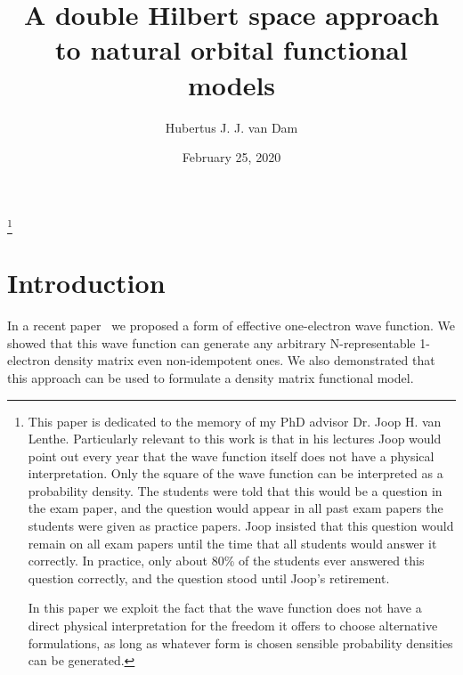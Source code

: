 \documentclass[pra,nofootinbib]{revtex4-1}
\begin{document}
\title{A double Hilbert space approach to natural orbital functional models}

\author{Hubertus J. J. van Dam}
\date{February 25, 2020}

\begin{abstract}
\end{abstract}

\maketitle
\tableofcontents

\footnote{This paper is dedicated to the memory of my PhD advisor Dr. Joop H. van Lenthe.
Particularly relevant to this work is that in his lectures Joop would point out every year that the wave function
itself does not have a physical interpretation. Only the square of the wave function can be interpreted
as a probability density. The students were told that this would be a question in the exam paper, and the
question would appear in all past exam papers the students were given as practice papers. Joop insisted
that this question would remain on all exam papers until the time that all students would answer it 
correctly. In practice, only about 80\% of the students ever answered this question correctly, and the question
stood until Joop's retirement.

In this paper we exploit the fact that the wave function does not have a direct physical interpretation
for the freedom it offers to choose alternative formulations, as long as whatever form is chosen sensible
probability densities can be generated.}

\section{Introduction}

In a recent paper~\cite{van_Dam_2016} we proposed a form of effective
one-electron wave function. We showed that this wave function can generate any
arbitrary N-representable 1-electron density matrix even non-idempotent ones.
We also demonstrated that this approach can be used to formulate a density 
matrix functional model. 
\end{document}
